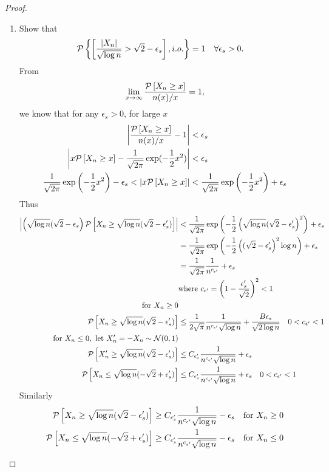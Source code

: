 \documentclass[11pt]{article}
\begin{document}
\begin{itemize}
\begin{proof}
\begin{enumerate}
\item Show that 
\begin{align*}
{\mathcal P}\left\{\left[\frac{\left\lvert X_{n} \right\rvert}{\sqrt{\log n}}>  \sqrt{2}-\epsilon_{s}\right], i.o.\right\} &=1\quad \forall \epsilon_{s}>0.
\end{align*}
From 
\begin{align*}
\lim\limits_{x\rightarrow \infty}\frac{{\mathcal P}\left[X_{n}\ge x\right]}{n(x)/x} = 1,
\end{align*}
we know that for any $\epsilon_{s}>0$, for large $x$
\begin{align*}
\left\lvert \frac{{\mathcal P}\left[X_{n}\ge x\right]}{n(x)/x} - 1 \right\rvert&<\epsilon_{s}\\
\left\lvert x{\mathcal P}\left[X_{n}\ge x\right] - \frac{1}{\sqrt{2\pi}}\exp(-\frac{1}{2}x^{2}) \right\rvert& <\epsilon_{s}\\ 
\frac{1}{\sqrt{2\pi}}\exp\left(-\frac{1}{2}x^{2}\right)- \epsilon_{s} < \left\lvert x{\mathcal P}\left[X_{n}\ge x\right] \right\rvert &< \frac{1}{\sqrt{2\pi}}\exp\left(-\frac{1}{2}x^{2}\right)+\epsilon_{s}
\end{align*}
Thus
\begin{align*}
\left\lvert \left( \sqrt{\log n}(\sqrt{2}- \epsilon_{s}\right){\mathcal P}\left[X_{n}\ge \sqrt{\log n}(\sqrt{2}- \epsilon'_{s})\right] \right\rvert &< \frac{1}{\sqrt{2\pi}}\exp\left(-\frac{1}{2} \left(\sqrt{\log n}(\sqrt{2}- \epsilon'_{s}\right)^{2}\right)+\epsilon_{s}\\
&= \frac{1}{\sqrt{2\pi}}\exp\left(-\frac{1}{2} \left((\sqrt{2}- \epsilon'_{s}\right)^{2}\log n\right)+\epsilon_{s}\\
&= \frac{1}{\sqrt{2\pi}}\frac{1}{n^{c_{\epsilon'}}}+\epsilon_{s}\\
&\text{where }c_{\epsilon'} = \left(1- \frac{\epsilon'_{s}}{\sqrt{2}}\right)^{2}<1\\
 \text{for }X_{n}\ge 0&\\
{\mathcal P}\left[X_{n}\ge \sqrt{\log n}(\sqrt{2}- \epsilon'_{s})\right]
&\le \frac{1}{2\sqrt{\pi}}\frac{1}{n^{c_{\epsilon'}}\sqrt{\log n}} + \frac{B\epsilon_{s}}{\sqrt{2\log n}}\quad 0<c_{\epsilon'}<1\\
 \text{for }X_{n}\le 0, \text{ let }X'_{n} = -X_{n}\sim {\mathcal N}(0,1)&\\
 {\mathcal P}\left[X'_{n}\ge \sqrt{\log n}(\sqrt{2}- \epsilon'_{s})\right]&\le C_{\epsilon'_{s}}\frac{1}{n^{c_{\epsilon'}}\sqrt{\log n}}+\epsilon_{s}\\
 {\mathcal P}\left[X_{n}\le \sqrt{\log n}(-\sqrt{2}+ \epsilon'_{s})\right]&\le C_{\epsilon'_{s}}\frac{1}{n^{c_{\epsilon'}}\sqrt{\log n}}+\epsilon_{s}\quad 0<c_{\epsilon'}<1
\end{align*}
Similarly
\begin{align*}
{\mathcal P}\left[X_{n}\ge \sqrt{\log n}(\sqrt{2}- \epsilon'_{s})\right]&\ge C_{\epsilon'_{s}}\frac{1}{n^{c_{\epsilon'}}\sqrt{\log n}}-\epsilon_{s}\quad \text{for }X_{n}\ge 0\\
{\mathcal P}\left[X_{n}\le \sqrt{\log n}(-\sqrt{2}+ \epsilon'_{s})\right]&\ge C_{\epsilon'_{s}}\frac{1}{n^{c_{\epsilon'}}\sqrt{\log n}}-\epsilon_{s}\quad \text{for }X_{n}\le 0
\end{align*}



\end{enumerate}
\end{proof}
\end{itemize}
\end{document}
